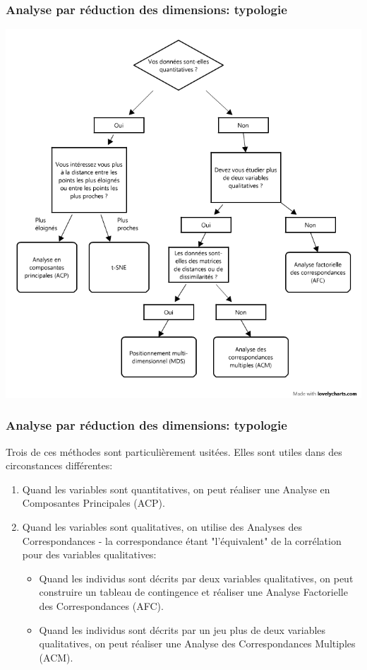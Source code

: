 \documentclass{beamer}
\begin{document}
\begin{frame}[fragile]
\frametitle{Analyse par réduction des dimensions: typologie}

\begin{center}
\includegraphics[height=8.6 cm]{img/af.png}
\end{center}

\end{frame}

\begin{frame}[fragile]
\frametitle{Analyse par réduction des dimensions: typologie}

Trois de ces méthodes sont particulièrement usitées. Elles sont utiles dans des circonstances différentes: 
\begin{enumerate}
\item Quand les variables sont quantitatives, on peut réaliser une \alert{Analyse en Composantes Principales (ACP)}.
\item Quand les variables sont qualitatives, on utilise des \alert{Analyses des Correspondances} - la correspondance étant "l'équivalent" de la corrélation pour des variables qualitatives:
\begin{itemize}
\item Quand les individus sont décrits par deux variables qualitatives, on peut construire un tableau de contingence et réaliser une \alert{Analyse Factorielle des Correspondances (AFC)}. 
\item Quand les individus sont décrits par un jeu plus de deux variables qualitatives, on peut réaliser une \alert{Analyse des Correspondances Multiples (ACM)}.
\end{itemize}

\end{enumerate}
\end{frame}
\end{document}
